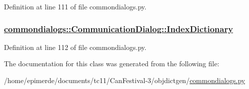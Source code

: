 Definition at line 111 of file commondialogs.py.\hypertarget{classcommondialogs_1_1CommunicationDialog_015f97d989d36b414e9370e41820a793}{
\subsubsection[IndexDictionary]{\setlength{\rightskip}{0pt plus 5cm}\hyperlink{classcommondialogs_1_1CommunicationDialog_015f97d989d36b414e9370e41820a793}{commondialogs::Communication\-Dialog::Index\-Dictionary}}}
\label{classcommondialogs_1_1CommunicationDialog_015f97d989d36b414e9370e41820a793}




Definition at line 112 of file commondialogs.py.

The documentation for this class was generated from the following file:\begin{CompactItemize}
\item 
/home/epimerde/documents/tc11/Can\-Festival-3/objdictgen/\hyperlink{commondialogs_8py}{commondialogs.py}\end{CompactItemize}
